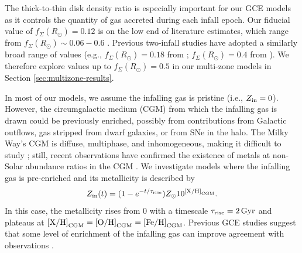 \documentclass[twocolumn,twocolappendix,linenumbers]{aastex631}
\newcommand{\mathXH}{{\rm [X/H]}}
\newcommand{\mathOH}{{\rm [O/H]}}
\newcommand{\mathFeH}{{\rm [Fe/H]}}
\newcommand{\mathOFe}{{\rm [O/Fe]}}
\begin{document}
The thick-to-thin disk density ratio is especially important for our GCE models as it controls the quantity of gas accreted during each infall epoch. Our fiducial value of $f_\Sigma(R_\odot)=0.12$ is on the low end of literature estimates, which range from $f_\Sigma(R_\odot)\sim0.06-0.6$ \citep[e.g.,][]{gilmore_new_1983,siegel_star_2002,juric_milky_2008,mackereth_age-metallicity_2017,fuhrmann_local_2017}. Previous two-infall studies have adopted a similarly broad range of values (e.g., $f_\Sigma(R_\odot)=0.18$ from \citealt{spitoni_apogee_2021}; $f_\Sigma(R_\odot)=0.4$ from \citealt{spitoni_remind_2024}). We therefore explore values up to $f_\Sigma(R_\odot)=0.5$ in our multi-zone models in Section \ref{sec:multizone-results}.

In most of our models, we assume the infalling gas is pristine (i.e., $Z_{\rm in}=0$). However, the circumgalactic medium (CGM) from which the infalling gas is drawn could be previously enriched, possibly from contributions from Galactic outflows, gas stripped from dwarf galaxies, or from SNe in the halo. The Milky Way's CGM is diffuse, multiphase, and inhomogeneous, making it difficult to study \citep[e.g.,][]{tumlinson_circumgalactic_2017,mathur_probing_2022}; still, recent observations have confirmed the existence of metals at non-Solar abundance ratios in the CGM \citep[e.g.,][]{das_discovery_2019,das_hot_2021,gupta_supervirial_2021}. We investigate models where the infalling gas is pre-enriched and its metallicity is described by
\begin{equation}
    \label{eq:pre-enrichment}
    Z_{\rm in}(t) = (1 - e^{-t/\tau_{\rm rise}}) Z_\odot 10^{\mathXH_{\rm CGM}}.
\end{equation}
In this case, the metallicity rises from 0 with a timescale $\tau_{\rm rise}=2\,{\rm Gyr}$ and plateaus at $\mathXH_{\rm CGM}=\mathOH_{\rm CGM}=\mathFeH_{\rm CGM}$. Previous GCE studies suggest that some level of enrichment of the infalling gas can improve agreement with observations \citep[e.g.,][]{palla_chemical_2020,johnson_milky_2024,spitoni_remind_2024}.
\end{document}
